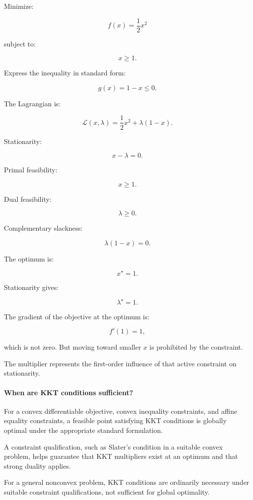 Minimize:

\[
f(x)=\frac12x^2
\]

subject to:

\[
x\ge1.
\]

Express the inequality in standard form:

\[
g(x)=1-x\le0.
\]

The Lagrangian is:

\[
\mathcal L(x,\lambda) = \frac12x^2+\lambda(1-x).
\]

Stationarity:

\[
x-\lambda=0.
\]

Primal feasibility:

\[
x\ge1.
\]

Dual feasibility:

\[
\lambda\ge0.
\]

Complementary slackness:

\[
\lambda(1-x)=0.
\]

The optimum is:

\[
\boxed{x^\star=1}.
\]

Stationarity gives:

\[
\boxed{\lambda^\star=1}.
\]

The gradient of the objective at the optimum is:

\[
f'(1)=1,
\]

which is not zero. But moving toward smaller \(x\) is prohibited by the constraint.

The multiplier represents the first-order influence of that active constraint on stationarity.

\paragraph{When are KKT conditions sufficient?}\label{02-foundations-ii-ch026-when-are-kkt-conditions-sufficient}

For a convex differentiable objective, convex inequality constraints, and affine equality constraints, a feasible point satisfying KKT conditions is globally optimal under the appropriate standard formulation.

A constraint qualification, such as Slater's condition in a suitable convex problem, helps guarantee that KKT multipliers exist at an optimum and that strong duality applies.

For a general nonconvex problem, KKT conditions are ordinarily necessary under suitable constraint qualifications, not sufficient for global optimality.

